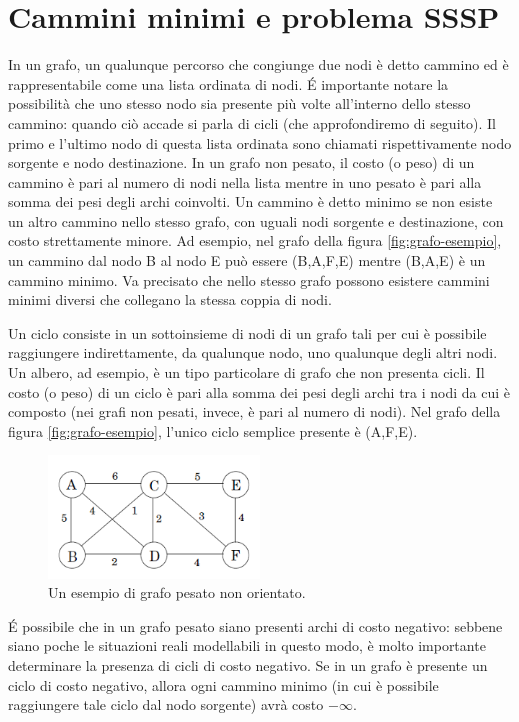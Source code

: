 \documentclass[12pt,a4paper,oneside]{book}
\begin{document}
	\section{Cammini minimi e problema SSSP}
	\label{section:sssp}
	In un grafo, un qualunque percorso che congiunge due nodi è detto cammino ed è rappresentabile come una lista ordinata di nodi. \'E importante notare la possibilità che uno stesso nodo sia presente più volte all'interno dello stesso cammino: quando ciò accade si parla di cicli (che approfondiremo di seguito). Il primo e l'ultimo nodo di questa lista ordinata sono chiamati rispettivamente nodo sorgente e nodo destinazione. In un grafo non pesato, il costo (o peso) di un cammino è pari al numero di nodi nella lista mentre in uno pesato è pari alla somma dei pesi degli archi coinvolti. Un cammino è detto minimo se non esiste un altro cammino nello stesso grafo, con uguali nodi sorgente e destinazione, con costo strettamente minore. Ad esempio, nel grafo della figura \ref{fig:grafo-esempio}, un cammino dal nodo B al nodo E può essere (B,A,F,E) mentre (B,A,E) è un cammino minimo. Va precisato che nello stesso grafo possono esistere cammini minimi diversi che collegano la stessa coppia di nodi.
	
	Un ciclo consiste in un sottoinsieme di nodi di un grafo tali per cui è possibile raggiungere indirettamente, da qualunque nodo, uno qualunque degli altri nodi. Un albero, ad esempio, è un tipo particolare di grafo che non presenta cicli. Il costo (o peso) di un ciclo è pari alla somma dei pesi degli archi tra i nodi da cui è composto (nei grafi non pesati, invece, è pari al numero di nodi). Nel grafo della figura \ref{fig:grafo-esempio}, l'unico ciclo semplice presente è (A,F,E). \begin{figure}
		\centering
		\includegraphics[width=0.5\textwidth]{grafo-esempio-2}
		\caption{Un esempio di grafo pesato non orientato.}
		\label{fig:grafo-esempio-2}
	\end{figure}
	\'E possibile che in un grafo pesato siano presenti archi di costo negativo: sebbene siano poche le situazioni reali modellabili in questo modo, è molto importante determinare la presenza di cicli di costo negativo. Se in un grafo è presente un ciclo di costo negativo, allora ogni cammino minimo (in cui è possibile raggiungere tale ciclo dal nodo sorgente) avrà costo $-\infty$.
	
\end{document}

